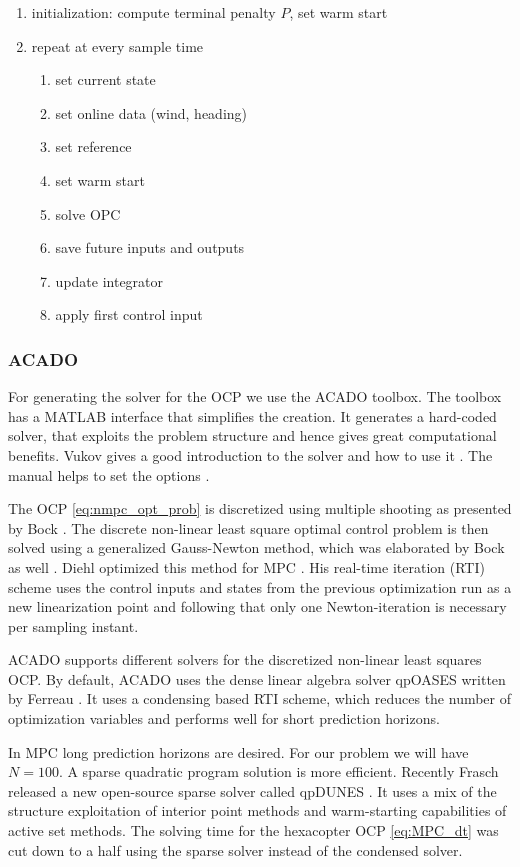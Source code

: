 \begin{enumerate}
\item initialization: compute terminal penalty $P$, set warm start
\item repeat at every sample time
\begin{enumerate}
\item set current state
\item set online data (wind, heading)
\item set reference
\item set warm start
\item solve OPC
\item save future inputs and outputs
\item update integrator
\item apply first control input
\end{enumerate}
\end{enumerate}
\subsubsection{ACADO}
For generating the solver for the OCP we use the ACADO toolbox. The toolbox has a MATLAB interface that simplifies the creation. It generates a hard-coded solver, that exploits the problem structure and hence gives great computational benefits. Vukov gives a good introduction to the solver and how to use it \cite{Vukov2013}. The manual helps to set the options \cite{www:acado}.

The OCP \ref{eq:nmpc_opt_prob} is discretized using multiple shooting as presented by Bock \cite{bock1984multiple}. The discrete non-linear least square optimal control problem is then solved using a generalized Gauss-Newton method, which was elaborated by Bock as well \cite{Bock1983}. Diehl optimized this method for MPC \cite{Diehl2005}. His real-time iteration (RTI) scheme  uses the control inputs and states from the previous optimization run as a new linearization point and following that only one Newton-iteration is necessary per sampling instant.

ACADO supports different solvers for the discretized non-linear least squares OCP. By default, ACADO uses the dense linear algebra solver qpOASES written by Ferreau \cite{Ferreau2014}. It uses a condensing based RTI scheme, which reduces the number of optimization variables and performs well for short prediction horizons.

In MPC long prediction horizons are desired. For our problem we will have $N=100$. A sparse quadratic program solution is more efficient. Recently Frasch released a new open-source sparse solver called qpDUNES \cite{Frasch}. It uses a mix of the structure exploitation of interior point methods and warm-starting capabilities of active set methods. The solving time for the hexacopter OCP \ref{eq:MPC_dt} was cut down to a half using the sparse solver instead of the condensed solver.

